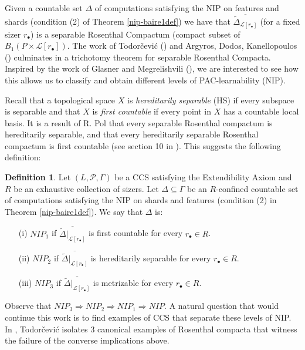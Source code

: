 \documentclass[psamsfonts]{amsart}
\theoremstyle{definition}
\newtheorem{defn}[thm]{Definition}
\theoremstyle{remark}
\numberwithin{equation}{section}
\begin{document}
Given a countable set $\Delta$ of computations satisfying the NIP on features and shards (condition (2) of Theorem \ref{nip-baire1def}) we have that $\overline{\tilde\Delta_{\mathcal{L}[r_\bullet]}}$ (for a fixed sizer $r_\bullet$) is a separable Rosenthal Compactum (compact subset of $B_1(P\times\mathcal{L}[r_\bullet])$. The work of Todorčević (\cite{Todorcevic_1999_CompactSubsetsBaire}) and Argyros, Dodos, Kanellopoulos (\cite{argyros2008rosenthal}) culminates in a trichotomy theorem for separable Rosenthal Compacta. Inspired by the work of Glasner and Megrelishvili (\cite{glasner2022tame}), we are interested to see how this allows us to classify and obtain different levels of PAC-learnability (NIP).

Recall that a topological space $X$ is \emph{hereditarily separable} (HS) if every subspace is separable and that $X$ is \emph{first countable} if every point in $X$ has a countable local basis. It is a result of R. Pol that every separable Rosenthal compactum is hereditarily separable, and that every hereditarily separable Rosenthal compactum is first countable (see section 10 in \cite{debs2013rosenthal}). This suggests the following definition:

\begin{defn}
    Let $(L,\mathcal{P},\Gamma)$ be a CCS satisfying the Extendibility Axiom and $R$ be an exhaustive collection of sizers. Let $\Delta\subseteq\Gamma$ be an $R$-confined countable set of computations satisfying the NIP on shards and features (condition (2) in Theorem \ref{nip-baire1def}). We say that $\Delta$ is:
    \begin{itemize}
        \item [(i)] $NIP_1$ if $\overline{\tilde\Delta|_{\mathcal{L}[r_\bullet]}}$ is first countable for every $r_\bullet\in R$.
        \item [(ii)] $NIP_2$ if $\overline{\tilde\Delta|_{\mathcal{L}[r_\bullet]}}$ is hereditarily separable for every $r_\bullet\in R$.
        \item [(iii)] $NIP_3$ if $\overline{\tilde\Delta|_{\mathcal{L}[r_\bullet]}}$ is metrizable for every $r_\bullet\in R$.
    \end{itemize}
\end{defn}

Observe that $NIP_3 \Rightarrow NIP_2\Rightarrow NIP_1\Rightarrow NIP$. A natural question that would continue this work is to find examples of CCS that separate these levels of NIP. In \cite{Todorcevic_1999_CompactSubsetsBaire}, Todorčević isolates 3 canonical examples of Rosenthal compacta that witness the failure of the converse implications above.
\end{document}
